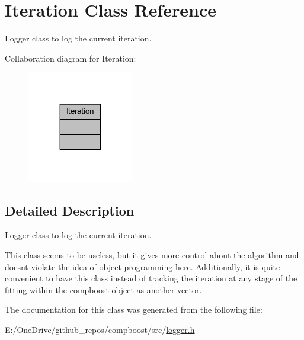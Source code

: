 \hypertarget{class_iteration}{}\section{Iteration Class Reference}
\label{class_iteration}


Logger class to log the current iteration.  




Collaboration diagram for Iteration\+:\nopagebreak
\begin{figure}[H]
\begin{center}
\leavevmode
\includegraphics[width=131pt]{class_iteration__coll__graph}
\end{center}
\end{figure}


\subsection{Detailed Description}
Logger class to log the current iteration. 

This class seems to be useless, but it gives more control about the algorithm and doesn\textquotesingle{}t violate the idea of object programming here. Additionally, it is quite convenient to have this class instead of tracking the iteration at any stage of the fitting within the compboost object as another vector. 

The documentation for this class was generated from the following file\+:\begin{DoxyCompactItemize}
\item 
E\+:/\+One\+Drive/github\+\_\+repos/compboost/src/\mbox{\hyperlink{logger_8h}{logger.\+h}}\end{DoxyCompactItemize}

